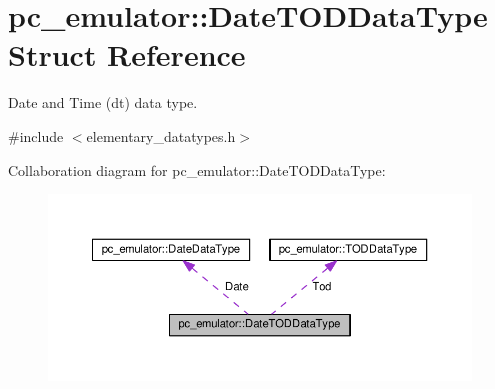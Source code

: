 \hypertarget{structpc__emulator_1_1DateTODDataType}{}\section{pc\+\_\+emulator\+:\+:Date\+T\+O\+D\+Data\+Type Struct Reference}
\label{structpc__emulator_1_1DateTODDataType}


Date and Time (dt) data type.  




{\ttfamily \#include $<$elementary\+\_\+datatypes.\+h$>$}



Collaboration diagram for pc\+\_\+emulator\+:\+:Date\+T\+O\+D\+Data\+Type\+:\nopagebreak
\begin{figure}[H]
\begin{center}
\leavevmode
\includegraphics[width=350pt]{structpc__emulator_1_1DateTODDataType__coll__graph}
\end{center}
\end{figure}
